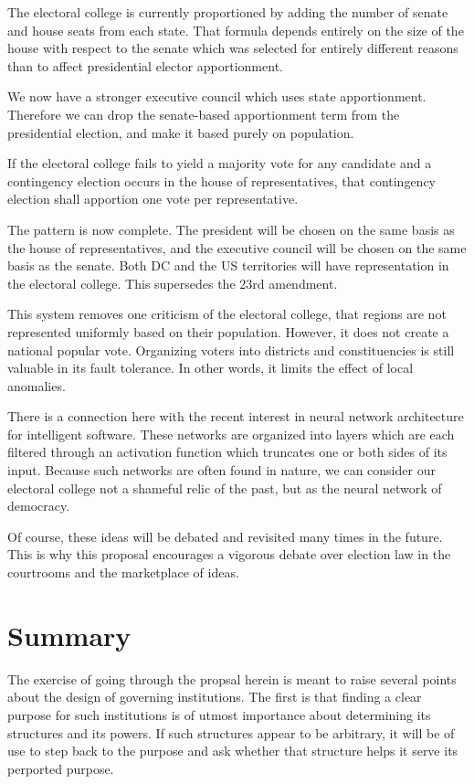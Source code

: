 \documentclass{article}
\begin{document}
The electoral college is currently proportioned by adding the number of senate and house seats from each state. That formula depends entirely on the size of the house with respect to the senate which was selected for entirely different reasons than to affect presidential elector apportionment.

We now have a stronger executive council which uses state apportionment. Therefore we can drop the senate-based apportionment term from the presidential election, and make it based purely on population.

\begin{quoting}
If the electoral college fails to yield a majority vote for any candidate and a contingency election occurs in the house of representatives, that contingency election shall apportion one vote per representative.
\end{quoting}

The pattern is now complete. The president will be chosen on the same basis as the house of representatives, and the executive council will be chosen on the same basis as the senate. Both DC and the US territories will have representation in the electoral college. This supersedes the 23rd amendment.

This system removes one criticism of the electoral college, that regions are not represented uniformly based on their population. However, it does not create a national popular vote. Organizing voters into districts and constituencies is still valuable in its fault tolerance. In other words, it limits the effect of local anomalies.

There is a connection here with the recent interest in neural network architecture for intelligent software. These networks are organized into layers which are each filtered through an activation function which truncates one or both sides of its input. Because such networks are often found in nature, we can consider our electoral college not a shameful relic of the past, but as the neural network of democracy.

Of course, these ideas will be debated and revisited many times in the future. This is why this proposal encourages a vigorous debate over election law in the courtrooms and the marketplace of ideas.

\section{Summary}

The exercise of going through the propsal herein is meant to raise several points about the design of governing institutions. The first is that finding a clear purpose for such institutions is of utmost importance about determining its structures and its powers. If such structures appear to be arbitrary, it will be of use to step back to the purpose and ask whether that structure helps it serve its perported purpose.
\end{document}
